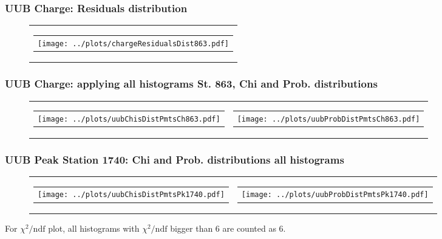 \documentclass[aspectratio=169]{beamer}
\begin{document}
\begin{frame}
  \frametitle{UUB Charge: Residuals distribution}
  \begin{figure}
    \centering
    \begin{tabularx}{\textwidth}{C}
      \begin{tabular}{l}
        \texttt{[image: ../plots/chargeResidualsDist863.pdf]}
      \end{tabular}
    \end{tabularx}
  \end{figure}
\end{frame}


\begin{frame}
  \frametitle{UUB Charge: applying all histograms St. 863, Chi and Prob. distributions}
  \begin{figure}
    \centering
    \begin{tabularx}{\textwidth}{CC}
      \begin{tabular}{l}
        \texttt{[image: ../plots/uubChisDistPmtsCh863.pdf]}
      \end{tabular}
      &
      \begin{tabular}{l}
        \texttt{[image: ../plots/uubProbDistPmtsCh863.pdf]}
      \end{tabular}
    \end{tabularx}
  \end{figure}
\end{frame}


\begin{frame}
  \frametitle{UUB Peak Station 1740: Chi and Prob. distributions all histograms}
  \begin{figure}
    \centering
    \begin{tabularx}{\textwidth}{CC}
      \begin{tabular}{l}
        \texttt{[image: ../plots/uubChisDistPmtsPk1740.pdf]}
      \end{tabular}
      &
      \begin{tabular}{l}
        \texttt{[image: ../plots/uubProbDistPmtsPk1740.pdf]}
      \end{tabular}
    \end{tabularx}
  \end{figure}
  For $\chi^2 / \mathrm{ndf}$ plot, all histograms with $\chi^2 / \mathrm{ndf}$ 
  bigger than 6 are counted as 6.
\end{frame}
\end{document}
